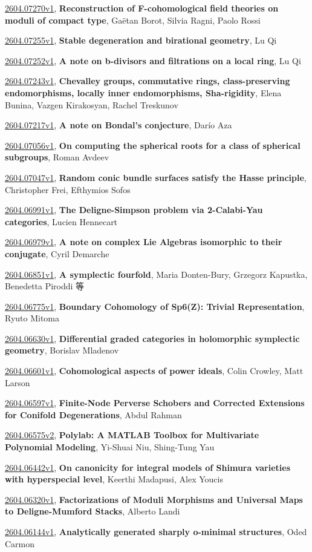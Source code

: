 \documentclass[9pt, a4paper]{article}
\theoremstyle{plain}
\theoremstyle{definition}
\theoremstyle{remark}
\newcommand{\arxiv}[3]{\href{https://arxiv.org/abs/#1}{#1}, \textbf{\textcolor{arxivblue}{#2}}, #3}
\begin{document}
\arxiv{2604.07270v1}{Reconstruction of F-cohomological field theories on moduli of compact type}{Gaëtan Borot, Silvia Ragni, Paolo Rossi}

\arxiv{2604.07255v1}{Stable degeneration and birational geometry}{Lu Qi}

\arxiv{2604.07252v1}{A note on b-divisors and filtrations on a local ring}{Lu Qi}

\arxiv{2604.07243v1}{Chevalley groups, commutative rings, class-preserving endomorphisms, locally inner endomorphisms, Sha-rigidity}{Elena Bunina, Vazgen Kirakosyan, Rachel Treskunov}

\arxiv{2604.07217v1}{A note on Bondal's conjecture}{Darío Aza}

\arxiv{2604.07056v1}{On computing the spherical roots for a class of spherical subgroups}{Roman Avdeev}

\arxiv{2604.07047v1}{Random conic bundle surfaces satisfy the Hasse principle}{Christopher Frei, Efthymios Sofos}

\arxiv{2604.06991v1}{The Deligne-Simpson problem via 2-Calabi-Yau categories}{Lucien Hennecart}

\arxiv{2604.06979v1}{A note on complex Lie Algebras isomorphic to their conjugate}{Cyril Demarche}

\arxiv{2604.06851v1}{A symplectic fourfold}{Maria Donten-Bury, Grzegorz Kapustka, Benedetta Piroddi 等}

\arxiv{2604.06775v1}{Boundary Cohomology of Sp6(Z): Trivial Representation}{Ryuto Mitoma}

\arxiv{2604.06630v1}{Differential graded categories in holomorphic symplectic geometry}{Borislav Mladenov}

\arxiv{2604.06601v1}{Cohomological aspects of power ideals}{Colin Crowley, Matt Larson}

\arxiv{2604.06597v1}{Finite-Node Perverse Schobers and Corrected Extensions for Conifold Degenerations}{Abdul Rahman}

\arxiv{2604.06575v2}{Polylab: A MATLAB Toolbox for Multivariate Polynomial Modeling}{Yi-Shuai Niu, Shing-Tung Yau}

\arxiv{2604.06442v1}{On canonicity for integral models of Shimura varieties with hyperspecial level}{Keerthi Madapusi, Alex Youcis}

\arxiv{2604.06320v1}{Factorizations of Moduli Morphisms and Universal Maps to Deligne-Mumford Stacks}{Alberto Landi}

\arxiv{2604.06144v1}{Analytically generated sharply o-minimal structures}{Oded Carmon}
\end{document}
